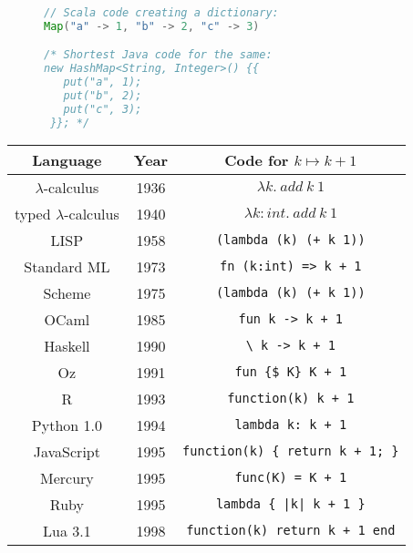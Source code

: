 \begin{wrapfigure}{l}{0.38\columnwidth}%
\vspace{-0.7\baselineskip}
\begin{lstlisting}[language=Java]
// Scala code creating a dictionary:
Map("a" -> 1, "b" -> 2, "c" -> 3)

/* Shortest Java code for the same:
new HashMap<String, Integer>() {{
   put("a", 1);
   put("b", 2);
   put("c", 3);
 }}; */
\end{lstlisting}

\vspace{0\baselineskip}
\end{wrapfigure}%
\begin{wraptable}{r}{0.6\columnwidth}%
\begin{centering}
\vspace{-7.5\baselineskip}
\begin{tabular}{|c|c|c|}
\hline 
\textbf{Language} & \textbf{Year} & \textbf{Code for }$k\mapsto k+1$\tabularnewline
\hline 
\hline 
{\footnotesize{}$\lambda$-calculus} & {\footnotesize{}1936} & $\lambda k.~add~k~1$\tabularnewline
\hline 
{\footnotesize{}typed $\lambda$-calculus} & {\footnotesize{}1940} & $\lambda k:int.~add~k~1$\tabularnewline
\hline 
{\footnotesize{}LISP} & {\footnotesize{}1958} & \texttt{\footnotesize{}}\lstinline!(lambda (k) (+ k 1))!\tabularnewline
\hline 
{\footnotesize{}Standard ML} & {\footnotesize{}1973} & \texttt{\footnotesize{}}\lstinline!fn (k:int) => k + 1!\tabularnewline
\hline 
{\footnotesize{}Scheme} & {\footnotesize{}1975} & \texttt{\footnotesize{}}\lstinline!(lambda (k) (+ k 1))!\tabularnewline
\hline 
{\footnotesize{}OCaml} & {\footnotesize{}1985} & \lstinline!fun k -> k + 1!\tabularnewline
\hline 
{\footnotesize{}Haskell} & {\footnotesize{}1990} & \lstinline!\ k -> k + 1!\tabularnewline
\hline 
{\footnotesize{}Oz} & {\footnotesize{}1991} & \lstinline!fun {$ K} K + 1!\tabularnewline
\hline 
{\footnotesize{}R} & {\footnotesize{}1993} & \lstinline!function(k) k + 1!\tabularnewline
\hline 
{\footnotesize{}Python 1.0} & {\footnotesize{}1994} & \lstinline!lambda k: k + 1!\tabularnewline
\hline 
{\footnotesize{}JavaScript} & {\footnotesize{}1995} & \lstinline!function(k) { return k + 1; }!\tabularnewline
\hline 
{\footnotesize{}Mercury} & {\footnotesize{}1995} & \lstinline!func(K) = K + 1!\tabularnewline
\hline 
{\footnotesize{}Ruby} & {\footnotesize{}1995} & \lstinline!lambda { |k| k + 1 }!\tabularnewline
\hline 
{\footnotesize{}Lua 3.1} & {\footnotesize{}1998} & \lstinline!function(k) return k + 1 end!\tabularnewline

\end{tabular}
\end{centering}
\end{wraptable}
